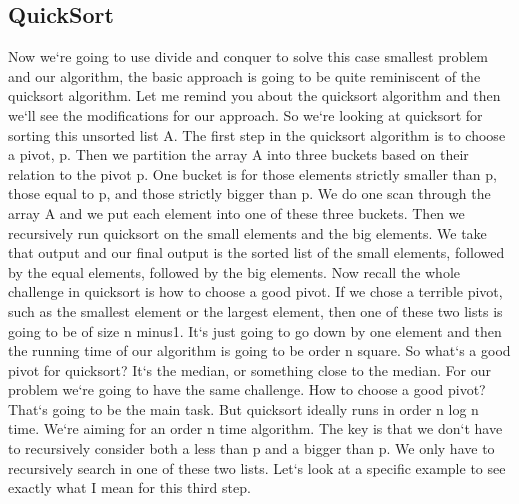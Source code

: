 \subsection{QuickSort}
Now we`re going to use divide and conquer to solve this case smallest problem and our algorithm, the basic approach is going to be quite reminiscent of the quicksort algorithm.
Let me remind you about the quicksort algorithm and then we`ll see the modifications for our approach.
So we`re looking at quicksort for sorting this unsorted list A\@.
The first step in the quicksort algorithm is to choose a pivot, p.
Then we partition the array A into three buckets based on their relation to the pivot p.
One bucket is for those elements strictly smaller than p, those equal to p, and those strictly bigger than p.
We do one scan through the array A and we put each element into one of these three buckets.
Then we recursively run quicksort on the small elements and the big elements.
We take that output and our final output is the sorted list of the small elements, followed by the equal elements, followed by the big elements.
Now recall the whole challenge in quicksort is how to choose a good pivot.
If we chose a terrible pivot, such as the smallest element or the largest element, then one of these two lists is going to be of size n minus1.
It`s just going to go down by one element and then the running time of our algorithm is going to be order n square.
So what`s a good pivot for quicksort? It`s the median, or something close to the median.
For our problem we`re going to have the same challenge.
How to choose a good pivot? That`s going to be the main task.
But quicksort ideally runs in order n log n time.
We`re aiming for an order n time algorithm.
The key is that we don`t have to recursively consider both a less than p and a bigger than p.
We only have to recursively search in one of these two lists.
Let`s look at a specific example to see exactly what I mean for this third step.

